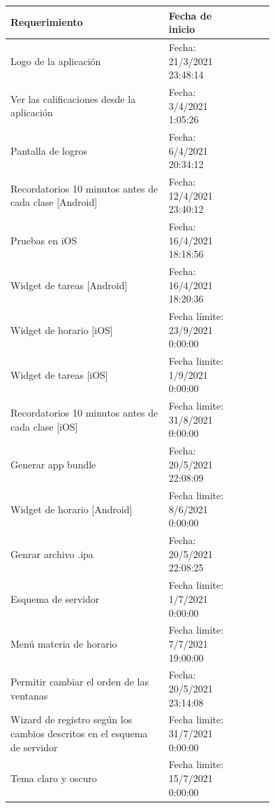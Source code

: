\documentclass[10pt]{article}
\begin{document}
\newpage

\centering
\begin{table}[H]
\begin{tabular}{|p{0.6\linewidth}|l |p{0.15\linewidth}|}
\hline
\textbf{Requerimiento}                                   & \textbf{Fecha de inicio} \\ \hline
{Logo de la aplicación}                                  &  Fecha: 21/3/2021 23:48:14 \\ \hline
{Ver las calificaciones desde la aplicación}             &  Fecha: 3/4/2021 1:05:26 \\ \hline
{Pantalla de logros}                                     &  Fecha: 6/4/2021 20:34:12\\ \hline
{Recordatorios 10 minutos antes de cada clase [Android]} &  Fecha: 12/4/2021 23:40:12 \\ \hline
{Pruebas en iOS}                                         &  Fecha: 16/4/2021 18:18:56 \\ \hline
{Widget de tareas [Android]}                             &  Fecha: 16/4/2021 18:20:36 \\ \hline
{Widget de horario [iOS]}                                &  Fecha límite: 23/9/2021 0:00:00 \\ \hline
{Widget de tareas [iOS]}                                 &  Fecha limite: 1/9/2021 0:00:00 \\ \hline
{Recordatorios 10 minutos antes de cada clase [iOS]}     &  Fecha limite: 31/8/2021 0:00:00 \\
\hline 
{Generar app bundle}                                     & Fecha: 20/5/2021 22:08:09  \\ \hline
{Widget de horario [Android]}                            & Fecha limite: 8/6/2021 0:00:00  \\ \hline
{Genrar archivo .ipa}                                    & Fecha: 20/5/2021 22:08:25  \\ \hline
{Esquema de servidor}                                    & Fecha limite: 1/7/2021 0:00:00 \\ \hline
{Menú materia de horario}                                & Fecha limite: 7/7/2021 19:00:00  \\ \hline
{Permitir cambiar el orden de las ventanas}              & Fecha: 20/5/2021 23:14:08  \\ \hline
{Wizard de registro según los cambios descritos en el esquema de servidor} & Fecha limite: 31/7/2021 0:00:00   \\ \hline
{Tema claro y oscuro}              & Fecha limite: 15/7/2021 0:00:00  \\ \hline

\end{tabular}
\end{table}
\end{document}
